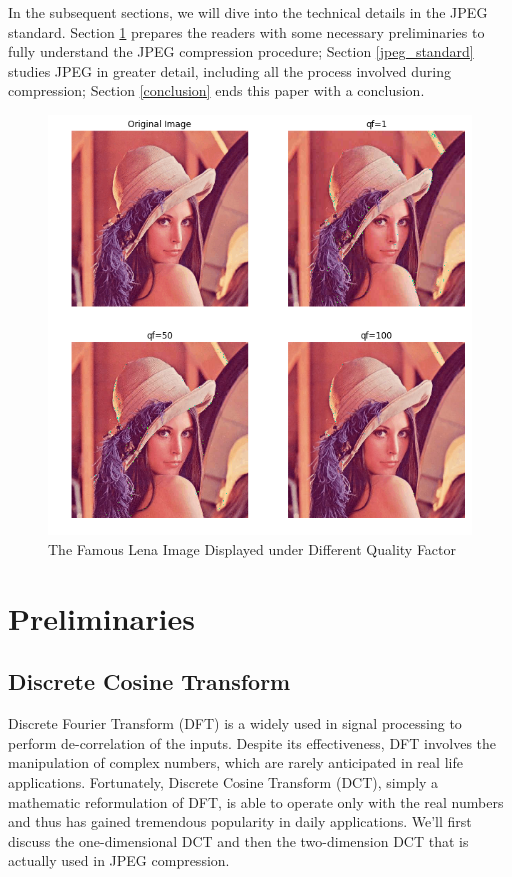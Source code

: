\documentclass[11pt]{article}
\begin{document}
In the subsequent sections, we will dive into the technical details in the JPEG standard. Section \ref{prelim} prepares the readers with some necessary preliminaries to fully understand the JPEG compression procedure; Section \ref{jpeg_standard} studies JPEG in greater detail, including all the process involved during compression; Section \ref{conclusion} ends this paper with a conclusion.
\begin{figure}
\includegraphics[width=\textwidth]{images/effect_of_q.png}
\caption{The Famous Lena Image Displayed under Different Quality Factor}
\label{effect_of_q}
\end{figure}
\section{Preliminaries}\label{prelim}
\subsection{Discrete Cosine Transform}\label{dct}
Discrete Fourier Transform (DFT) is a widely used in signal processing to perform de-correlation of the inputs. Despite its effectiveness, DFT involves the manipulation of complex numbers, which are rarely anticipated in real life applications. Fortunately, Discrete Cosine Transform (DCT), simply a mathematic reformulation of DFT, is able to operate only with the real numbers and thus has gained tremendous popularity in daily applications. We'll first discuss the one-dimensional DCT and then the two-dimension DCT that is actually used in JPEG compression.
\end{document}

